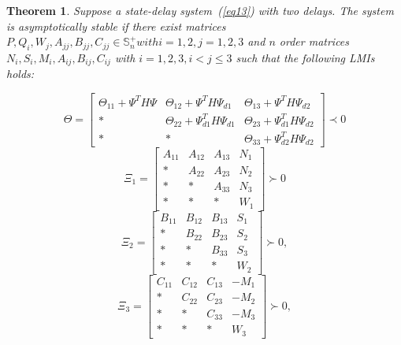 \documentclass[journal]{IEEEtran}
\newtheorem{theorem}{Theorem}
\begin{document}
\begin{theorem}
  Suppose a state-delay system~(\ref{eq13}) with two delays. The system is asymptotically stable if there exist matrices $P,Q_i,W_j,A_{jj},B_{jj},C_{jj}\in\mathbb{S}_n^+ with i=1,2,j=1,2,3$ and $n$ order matrices $N_i,S_i,M_i,A_{ij},B_{ij},C_{ij}$ with $i=1,2,3,i<j\le3$ such that the following LMIs holds:

  \begin{equation}
    \Theta  = \left[ {\begin{array}{*{20}{c}}
            {{\Theta _{11}} + {\Psi ^T}H\Psi } & {{\Theta _{12}} + {\Psi ^T}H{\Psi _{d1}}}    & {{\Theta _{13}} + {\Psi ^T}H{\Psi _{d2}}}    \\
            *                                  & {{\Theta _{22}} + \Psi _{d1}^TH{\Psi _{d1}}} & {{\Theta _{23}} + \Psi _{d1}^TH{\Psi _{d2}}} \\
            *                                  & *                                            & {{\Theta _{33}} + \Psi _{d2}^TH{\Psi _{d2}}}
          \end{array}} \right] \prec 0
    \label{eq42}
  \end{equation}
  \begin{equation}
    {\Xi _1} = \left[ {\begin{array}{*{20}{c}}
            {{A_{11}}} & {{A_{12}}} & {{A_{13}}} & {{N_1}} \\
            *          & {{A_{22}}} & {{A_{23}}} & {{N_2}} \\
            *          & *          & {{A_{33}}} & {{N_3}} \\
            *          & *          & *          & {{W_1}}
          \end{array}} \right] \succ 0
    \label{eq43}
  \end{equation}
  \begin{equation}
    {\Xi _2} = \left[ {\begin{array}{*{20}{c}}
            {{B_{11}}} & {{B_{12}}} & {{B_{13}}} & {{S_1}} \\
            *          & {{B_{22}}} & {{B_{23}}} & {{S_2}} \\
            *          & *          & {{B_{33}}} & {{S_3}} \\
            *          & *          & *          & {{W_2}}
          \end{array}} \right] \succ 0,
    \label{eq44}
  \end{equation}
  \begin{equation}
    {\Xi _3} = \left[ {\begin{array}{*{20}{c}}
            {{C_{11}}} & {{C_{12}}} & {{C_{13}}} & { - {M_1}} \\
            *          & {{C_{22}}} & {{C_{23}}} & { - {M_2}} \\
            *          & *          & {{C_{33}}} & { - {M_3}} \\
            *          & *          & *          & {{W_3}}
          \end{array}} \right] \succ 0,
    \label{eq45}
  \end{equation}


\end{theorem}
\end{document}
